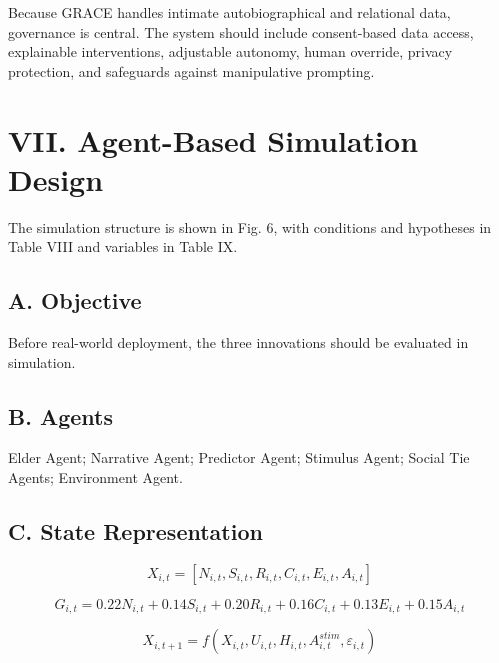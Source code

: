 \documentclass[
  journal,
]{IEEEtran}%
\begin{document}
Because GRACE handles intimate autobiographical and relational data,
governance is central. The system should include consent-based data
access, explainable interventions, adjustable autonomy, human override,
privacy protection, and safeguards against manipulative prompting.

\section{VII. Agent-Based Simulation
Design}\label{vii.-agent-based-simulation-design}

The simulation structure is shown in Fig. 6, with conditions and
hypotheses in Table VIII and variables in Table IX.

\subsection{A. Objective}\label{a.-objective}

Before real-world deployment, the three innovations should be evaluated
in simulation.

\subsection{B. Agents}\label{b.-agents}

Elder Agent; Narrative Agent; Predictor Agent; Stimulus Agent; Social
Tie Agents; Environment Agent.

\subsection{C. State Representation}\label{c.-state-representation}

\[X_{i,t} = [N_{i,t}, S_{i,t}, R_{i,t}, C_{i,t}, E_{i,t}, A_{i,t}]\]

\[G_{i,t} = 0.22N_{i,t} + 0.14S_{i,t} + 0.20R_{i,t} + 0.16C_{i,t} + 0.13E_{i,t} + 0.15A_{i,t}\]

\[X_{i,t+1} = f(X_{i,t}, U_{i,t}, H_{i,t}, A_{i,t}^{stim}, \varepsilon_{i,t})\]
\end{document}
